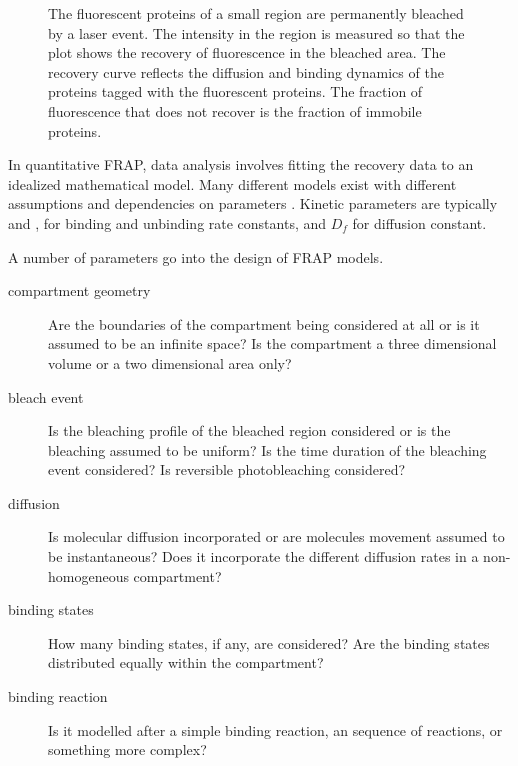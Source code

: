 \begin{figure}

                   {The fluorescent proteins of a small region are
                    permanently bleached by a laser event. The
                    intensity in the region is measured so that the
                    plot shows the recovery of fluorescence in the
                    bleached area.  The recovery curve reflects the
                    diffusion and binding dynamics of the proteins
                    tagged with the fluorescent proteins.  The
                    fraction of fluorescence that does not recover is
                    the fraction of immobile proteins.}
      \label{fig:intro:frap-curve-example}
    \end{figure}

    In quantitative FRAP, data analysis involves fitting the recovery
    data to an idealized mathematical model.
    Many different models exist with different assumptions
    and dependencies on
    parameters \citep{mcnally-frap-2010}.
    Kinetic parameters are typically \Kon{} and \Koff{}, for
    binding and unbinding rate constants, and $D_{f}$ for diffusion constant.

    A number of parameters go into the design of FRAP models.
    \begin{description}
    \item[compartment geometry] Are the boundaries of the compartment
      being considered at all or is it assumed to be an infinite space?
      Is the compartment a three dimensional volume or a two
      dimensional area only?
    \item[bleach event] Is the bleaching profile of the bleached
      region considered or is the bleaching assumed to be uniform?  Is
      the time duration of the bleaching event considered?  Is
      reversible photobleaching considered?
    \item[diffusion] Is molecular diffusion incorporated or are
      molecules movement assumed to be instantaneous?  Does it
      incorporate the different diffusion rates in a non-homogeneous
      compartment?
    \item[binding states] How many binding states, if any, are
      considered?  Are the binding states distributed equally within
      the compartment?
    \item[binding reaction] Is it modelled after a simple binding
      reaction, an sequence of reactions, or something more complex?
    \end{description}

